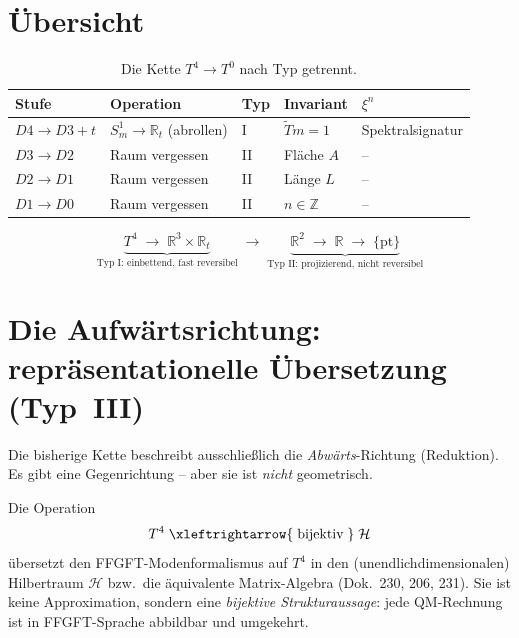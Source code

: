 \section{\"Ubersicht}

\begin{table}[h!]
\centering
\begin{tabular}{lllll}
\hline
\textbf{Stufe} & \textbf{Operation} & \textbf{Typ} & \textbf{Invariant} & \textbf{$\xi^n$} \\
\hline
$D4\to D3{+}t$ & $S^1_m\to\mathbb{R}_t$ (abrollen) & I & $\tilde{T}m=1$ & Spektralsignatur \\
$D3\to D2$ & Raum vergessen & II & Fl\"ache $A$ & -- \\
$D2\to D1$ & Raum vergessen & II & L\"ange $L$ & -- \\
$D1\to D0$ & Raum vergessen & II & $n\in\mathbb{Z}$ & -- \\
\hline
\end{tabular}
\caption{Die Kette $T^4 \to T^0$ nach Typ getrennt.}
\end{table}

\[
\underbrace{T^4 \;\longrightarrow\; \mathbb{R}^3\times\mathbb{R}_t}_{\text{Typ I: einbettend, fast reversibel}}
\;\longrightarrow\;
\underbrace{\mathbb{R}^2 \;\longrightarrow\; \mathbb{R} \;\longrightarrow\; \{\mathrm{pt}\}}_{\text{Typ II: projizierend, nicht reversibel}}
\]

\section{Die Aufw\"artsrichtung: repr\"asentationelle \"Ubersetzung (Typ~III)}

Die bisherige Kette beschreibt ausschlie\ss lich die \emph{Abw\"arts}-Richtung
(Reduktion). Es gibt eine Gegenrichtung -- aber sie ist \emph{nicht} geometrisch.

\begin{definition}\label{def:typeIII}
Die Operation
\[
  T^4 \;\xleftrightarrow{\;\text{bijektiv}\;}\; \mathcal{H}
\]
\"ubersetzt den FFGFT-Modenformalismus auf $T^4$ in den (unendlich\-dimensionalen)
Hilbertraum $\mathcal{H}$ bzw.\ die \"aquivalente Matrix-Algebra (Dok.~230, 206,
231). Sie ist keine Approximation, sondern eine \emph{bijektive
Strukturaussage}: jede QM-Rechnung ist in FFGFT-Sprache abbildbar und umgekehrt.
\end{definition}

